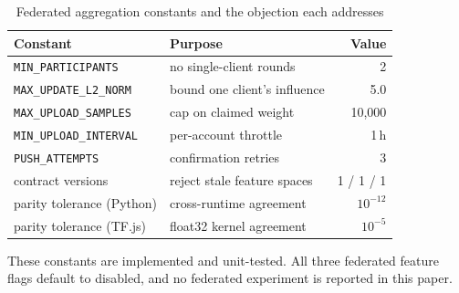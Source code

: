 \begin{table}[t]
\caption{Federated aggregation constants and the objection each addresses}
\label{tab:t10}
\centering
\footnotesize
\begin{tabular}{@{}llr@{}}
\toprule
Constant & Purpose & Value \\
\midrule
\texttt{MIN\_PARTICIPANTS} & no single-client rounds & 2 \\
\texttt{MAX\_UPDATE\_L2\_NORM} & bound one client's influence & 5.0 \\
\texttt{MAX\_UPLOAD\_SAMPLES} & cap on claimed weight & 10{,}000 \\
\texttt{MIN\_UPLOAD\_INTERVAL} & per-account throttle & 1\,h \\
\texttt{PUSH\_ATTEMPTS} & confirmation retries & 3 \\
contract versions & reject stale feature spaces & 1 / 1 / 1 \\
parity tolerance (Python) & cross-runtime agreement & $10^{-12}$ \\
parity tolerance (TF.js) & float32 kernel agreement & $10^{-5}$ \\
\bottomrule
\end{tabular}

\vspace{0.5mm}
\raggedright\footnotesize
These constants are implemented and unit-tested. All three federated feature flags
default to disabled, and no federated experiment is reported in this paper.
\end{table}
